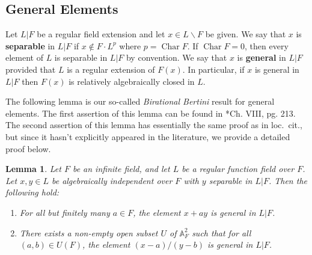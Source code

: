 \documentclass[11pt]{amsart}
\newtheorem{lemma}[proposition]{Lemma}
\theoremstyle{definition}
\theoremstyle{remark}
\numberwithin{equation}{section}
\DeclareMathOperator{\Char}{Char}
\newcommand{\Abb}{\mathbb{A}}
\begin{document}
\subsection{General Elements}
\label{subsection: strgen / general}

Let $L|F$ be a regular field extension and let $x \in L \smallsetminus F$ be given.
We say that $x$ is {\bf separable} in $L|F$ if $x \notin F \cdot L^p$ where $p = \Char F$.
If $\Char F = 0$, then every element of $L$ is separable in $L|F$ by convention.
We say that $x$ is {\bf general} in $L|F$ provided that $L$ is a regular extension of $F(x)$.
In particular, if $x$ is general in $L|F$ then $F(x)$ is relatively algebraically closed in $L$.

The following lemma is our so-called \emph{Birational Bertini} result for general elements.
The first assertion of this lemma can be found in \cite{Lang:1958}*{Ch. VIII, pg. 213}.
The second assertion of this lemma has essentially the same proof as in loc.~cit., but since it hasn't explicitly appeared in the literature, we provide a detailed proof below.
\begin{lemma}
\label{lemma: strgen / general / gen-birat-bertini}
  Let $F$ be an infinite field, and let $L$ be a regular function field over $F$.
  Let $x,y \in L$ be algebraically independent over $F$ with $y$ separable in $L|F$.
  Then the following hold:
  \begin{enumerate}
    \item For all but finitely many $a \in F$, the element $x+ay$ is general in $L|F$.
    \item There exists a non-empty open subset $U$ of $\Abb^2_F$ such that for all $(a,b) \in U(F)$, the element $(x-a)/(y-b)$ is general in $L|F$.
  \end{enumerate}
\end{lemma}
\end{document}
